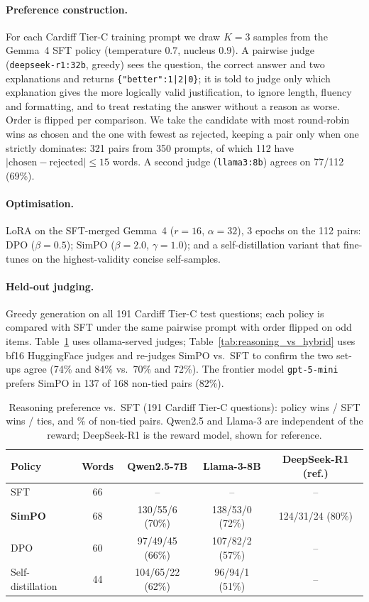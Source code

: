 \paragraph{Preference construction.} For each Cardiff Tier-C training prompt we draw $K{=}3$ samples from the Gemma~4 SFT policy (temperature $0.7$, nucleus $0.9$). A pairwise judge (\texttt{deepseek-r1:32b}, greedy) sees the question, the correct answer and two explanations and returns \texttt{\{"better":1|2|0\}}; it is told to judge only which explanation gives the more logically valid justification, to ignore length, fluency and formatting, and to treat restating the answer without a reason as worse. Order is flipped per comparison. We take the candidate with most round-robin wins as chosen and the one with fewest as rejected, keeping a pair only when one strictly dominates: 321 pairs from 350 prompts, of which 112 have $|\text{chosen}-\text{rejected}|\le15$ words. A second judge (\texttt{llama3:8b}) agrees on 77/112 (69\%).

\paragraph{Optimisation.} LoRA on the SFT-merged Gemma~4 ($r{=}16$, $\alpha{=}32$), 3 epochs on the 112 pairs: DPO ($\beta{=}0.5$); SimPO ($\beta{=}2.0$, $\gamma{=}1.0$); and a self-distillation variant that fine-tunes on the highest-validity concise self-samples.

\paragraph{Held-out judging.} Greedy generation on all 191 Cardiff Tier-C test questions; each policy is compared with SFT under the same pairwise prompt with order flipped on odd items. Table~\ref{tab:reasoning_judges} uses ollama-served judges; Table~\ref{tab:reasoning_vs_hybrid} uses bf16 HuggingFace judges and re-judges SimPO vs.\ SFT to confirm the two set-ups agree (74\% and 84\% vs.\ 70\% and 72\%). The frontier model \texttt{gpt-5-mini} prefers SimPO in 137 of 168 non-tied pairs (82\%).

\begin{table}[H]
\centering
\small
\caption{Reasoning preference vs.\ SFT (191 Cardiff Tier-C questions): policy wins / SFT wins / ties, and \% of non-tied pairs. Qwen2.5 and Llama-3 are independent of the reward; DeepSeek-R1 is the reward model, shown for reference.}
\label{tab:reasoning_judges}
\begin{tabular}{lcccc}
\toprule
Policy & Words & Qwen2.5-7B & Llama-3-8B & DeepSeek-R1 (ref.) \\
\midrule
SFT & 66 & -- & -- & -- \\
\textbf{SimPO} & 68 & 130/55/6 (70\%) & 138/53/0 (72\%) & 124/31/24 (80\%) \\
DPO & 60 & 97/49/45 (66\%) & 107/82/2 (57\%) & -- \\
Self-distillation & 44 & 104/65/22 (62\%) & 96/94/1 (51\%) & -- \\
\bottomrule
\end{tabular}
\end{table}

